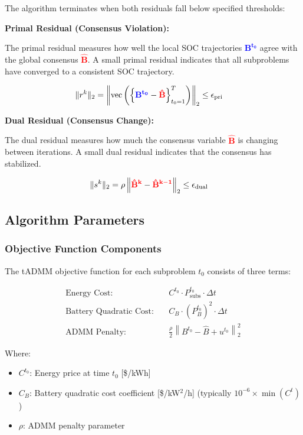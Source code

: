 The algorithm terminates when both residuals fall below specified thresholds:

\textbf{Primal Residual (Consensus Violation):}

The primal residual measures how well the local SOC trajectories \textcolor{blue}{$\mathbf{B^{t_0}}$} agree with the global consensus \textcolor{red}{$\mathbf{\hat{B}}$}. A small primal residual indicates that all subproblems have converged to a consistent SOC trajectory.

\begin{align}
\|r^k\|_2 &= \left\| \text{vec}\left( \left\{ \textcolor{blue}{\mathbf{B^{t_0}}} - \textcolor{red}{\mathbf{\hat{B}}} \right\}_{t_0=1}^T \right) \right\|_2 \leq \epsilon_{\text{pri}}
\end{align}

\textbf{Dual Residual (Consensus Change):}

The dual residual measures how much the consensus variable \textcolor{red}{$\mathbf{\hat{B}}$} is changing between iterations. A small dual residual indicates that the consensus has stabilized.

\begin{align}
\|s^k\|_2 &= \rho \left\| \textcolor{red}{\mathbf{\hat{B}^k}} - \textcolor{red}{\mathbf{\hat{B}^{k-1}}} \right\|_2 \leq \epsilon_{\text{dual}}
\end{align}

\subsection{Algorithm Parameters}

\subsubsection{Objective Function Components}

The tADMM objective function for each subproblem $t_0$ consists of three terms:

\begin{align}
\text{Energy Cost:} \quad & C^{t_0} \cdot P_{\text{subs}}^{t_0} \cdot \Delta t \\
\text{Battery Quadratic Cost:} \quad & C_B \cdot \left(P_{B}^{t_0}\right)^2 \cdot \Delta t \\
\text{ADMM Penalty:} \quad & \frac{\rho}{2} \left\| B^{t_0} - \hat{B} + u^{t_0} \right\|_2^2
\end{align}

Where:
\begin{itemize}
    \item $C^{t_0}$: Energy price at time $t_0$ [\$/kWh]
    \item $C_B$: Battery quadratic cost coefficient [\$/kW$^2$/h] (typically $10^{-6} \times \min(C^t)$)
    \item $\rho$: ADMM penalty parameter
\end{itemize}

